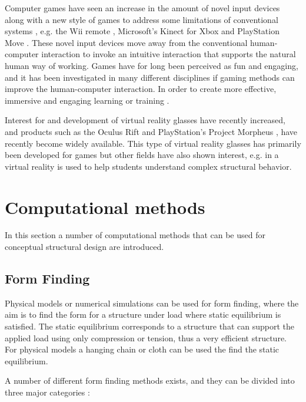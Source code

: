 Computer games have seen an increase in the amount of novel input devices along with a new style of games to address some limitations of conventional systems \cite{Kosmadoudi2013}, e.g. the Wii remote \cite{Nintendo}, Microsoft’s Kinect for Xbox \cite{Microsoft} and PlayStation Move \cite{Playstationa}. These novel input devices move away from the conventional human-computer interaction to invoke an intuitive interaction that supports the natural human way of working. Games have for long been perceived as fun and engaging, and it has been investigated in many different disciplines if gaming methods can improve the human-computer interaction. In order to create more effective, immersive and engaging learning or training \cite{Kosmadoudi2013}. 

Interest for and development of virtual reality glasses have recently increased, and products such as the Oculus Rift \cite{Oculus} and PlayStation’s Project Morpheus \cite{Playstation}, have recently become widely available. This type of virtual reality glasses has primarily been developed for games but other fields have also shown interest, e.g. in \cite{fogarty2014exploring} a virtual reality is used to help students understand complex structural behavior.

\chapter{Computational methods}
\label{ch:Computational methods}
In this section a number of computational methods that can be used for conceptual structural design are introduced. 

\section{Form Finding}
Physical models or numerical simulations can be used for form finding, where the aim is to find the form for a structure under load where static equilibrium is satisfied. The static equilibrium corresponds to a structure that can support the applied load using only compression or tension, thus a very efficient structure. For physical models a hanging chain or cloth can be used the find the static equilibrium.

A number of different form finding methods exists, and they can be divided into three major categories \cite{Veenendaal2012a}: 

